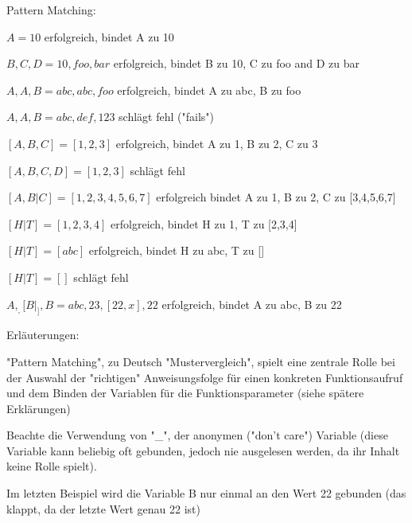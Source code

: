 \documentclass[10pt]{article}
\begin{document}
\begin{itemize*}
Pattern Matching:
\begin{itemize*}
  \item $A = 10$ erfolgreich, bindet A zu 10
  \item ${B, C, D} = {10, foo, bar}$ erfolgreich, bindet B zu 10, C zu foo and D zu bar
  \item ${A, A, B} = {abc, abc, foo}$ erfolgreich, bindet A zu abc, B zu foo
  \item ${A, A, B} = {abc, def, 123}$ schlägt fehl ("fails")
  \item $[A,B,C] = [1,2,3]$ erfolgreich, bindet A zu 1, B zu 2, C zu 3
  \item $[A,B,C,D] = [1,2,3]$ schlägt fehl
  \item $[A,B|C] = [1,2,3,4,5,6,7]$ erfolgreich bindet A zu 1, B zu 2, C zu [3,4,5,6,7]
  \item $[H|T] = [1,2,3,4]$ erfolgreich, bindet H zu 1, T zu [2,3,4]
  \item $[H|T] = [abc]$ erfolgreich, bindet H zu abc, T zu []
  \item $[H|T] = []$ schlägt fehl
  \item ${A,_, [B|_],{B}} = {abc,23,[22,x],{22}}$ erfolgreich, bindet A zu abc, B zu 22
  \item Erläuterungen:
  \begin{itemize*}
    \item "Pattern Matching", zu Deutsch "Mustervergleich", spielt eine zentrale Rolle bei der Auswahl der "richtigen" Anweisungsfolge für einen konkreten Funktionsaufruf und dem Binden der Variablen für die Funktionsparameter (siehe spätere Erklärungen)
    \item Beachte die Verwendung von "\_", der anonymen ("don't care") Variable (diese Variable kann beliebig oft gebunden, jedoch nie ausgelesen werden, da ihr Inhalt keine Rolle spielt).
    \item Im letzten Beispiel wird die Variable B nur einmal an den Wert 22 gebunden (das klappt, da der letzte Wert genau {22} ist)
  \end{itemize*}
\end{itemize*}


\end{itemize*}
\end{document}
